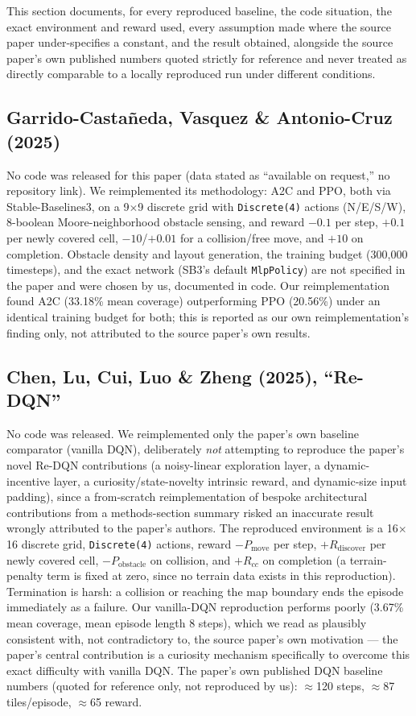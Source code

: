 \documentclass[conference]{IEEEtran}
\begin{document}
This section documents, for every reproduced baseline, the code situation, the exact environment and reward used, every assumption made where the source paper under-specifies a constant, and the result obtained, alongside the source paper's own published numbers quoted strictly for reference and never treated as directly comparable to a locally reproduced run under different conditions.

\subsection{Garrido-Casta\~neda, Vasquez \& Antonio-Cruz (2025)}
No code was released for this paper (data stated as ``available on request,'' no repository link). We reimplemented its methodology: A2C and PPO, both via Stable-Baselines3, on a 9$\times$9 discrete grid with \texttt{Discrete(4)} actions (N/E/S/W), 8-boolean Moore-neighborhood obstacle sensing, and reward $-0.1$ per step, $+0.1$ per newly covered cell, $-10$/$+0.01$ for a collision/free move, and $+10$ on completion. Obstacle density and layout generation, the training budget (300{,}000 timesteps), and the exact network (SB3's default \texttt{MlpPolicy}) are not specified in the paper and were chosen by us, documented in code. Our reimplementation found A2C (33.18\% mean coverage) outperforming PPO (20.56\%) under an identical training budget for both; this is reported as our own reimplementation's finding only, not attributed to the source paper's own results.

\subsection{Chen, Lu, Cui, Luo \& Zheng (2025), ``Re-DQN''}
No code was released. We reimplemented only the paper's own baseline comparator (vanilla DQN), deliberately \emph{not} attempting to reproduce the paper's novel Re-DQN contributions (a noisy-linear exploration layer, a dynamic-incentive layer, a curiosity/state-novelty intrinsic reward, and dynamic-size input padding), since a from-scratch reimplementation of bespoke architectural contributions from a methods-section summary risked an inaccurate result wrongly attributed to the paper's authors. The reproduced environment is a 16$\times$16 discrete grid, \texttt{Discrete(4)} actions, reward $-P_{\text{move}}$ per step, $+R_{\text{discover}}$ per newly covered cell, $-P_{\text{obstacle}}$ on collision, and $+R_{cc}$ on completion (a terrain-penalty term is fixed at zero, since no terrain data exists in this reproduction). Termination is harsh: a collision or reaching the map boundary ends the episode immediately as a failure. Our vanilla-DQN reproduction performs poorly (3.67\% mean coverage, mean episode length 8 steps), which we read as plausibly consistent with, not contradictory to, the source paper's own motivation --- the paper's central contribution is a curiosity mechanism specifically to overcome this exact difficulty with vanilla DQN. The paper's own published DQN baseline numbers (quoted for reference only, not reproduced by us): $\approx$120 steps, $\approx$87 tiles/episode, $\approx$65 reward.
\end{document}
